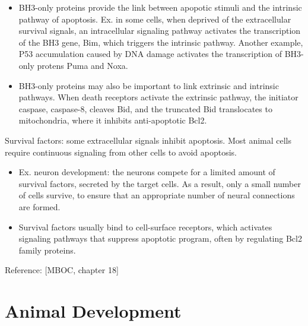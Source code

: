 \documentclass{report}
\begin{document}
\begin{enumerate}
\begin{itemize}
\item BH3-only proteins provide the link between apopotic stimuli and the intrinsic pathway of apoptosis. Ex. in some cells, when deprived of the extracellular survival signals, an intracellular signaling pathway activates the transcription of the BH3 gene, Bim, which triggers the intrinsic pathway. Another example, P53 accumulation caused by DNA damage activates the transcription of BH3-only protens Puma and Noxa. 

\item BH3-only proteins may also be important to link extrinsic and intrinsic pathways. When death receptors activate the extrinsic pathway, the initiator caspase, caspase-8, cleaves Bid, and the truncated Bid translocates to mitochondria, where it inhibits anti-apoptotic Bcl2. 
\end{itemize}

Survival factors: some extracellular signals inhibit apoptosis. Most animal cells require continuous signaling from other cells to avoid apoptosis. 
\begin{itemize}
	\item Ex. neuron development: the neurons compete for a limited amount of survival factors, secreted by the target cells. As a result, only a small number of cells survive, to ensure that an appropriate number of neural connections are formed. 
	\item Survival factors usually bind to cell-surface receptors, which activates signaling pathways that suppress apoptotic program, often by regulating Bcl2 family proteins. 
\end{itemize}

Reference: [MBOC, chapter 18] 

\end{enumerate}
\section{Animal Development}
\end{document}
